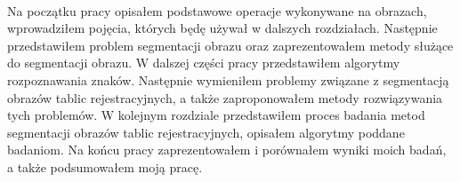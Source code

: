 \paragraph{}
Na początku pracy opisałem podstawowe operacje wykonywane na obrazach, wprowadziłem pojęcia, których będę używał w dalszych rozdziałach. Następnie przedstawiłem problem segmentacji obrazu oraz zaprezentowałem metody służące do segmentacji obrazu. W dalszej części pracy przedstawiłem algorytmy rozpoznawania znaków. Następnie wymieniłem problemy związane z segmentacją obrazów tablic rejestracyjnych, a także zaproponowałem metody rozwiązywania tych problemów. W kolejnym rozdziale przedstawiłem proces badania metod segmentacji obrazów tablic rejestracyjnych, opisałem algorytmy poddane badaniom. Na końcu pracy zaprezentowałem i porównałem wyniki moich badań, a także podsumowałem moją pracę.

